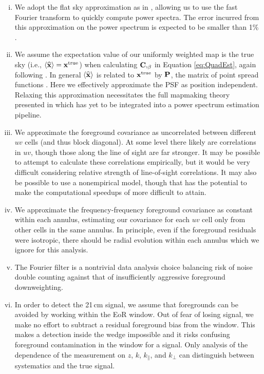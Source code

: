 \begin{enumerate}[i.]
\item We adopt the flat sky approximation as in \cite{DillonFast,X13}, allowing us to use the fast Fourier transform to quickly compute power spectra. The error incurred from this approximation on the power spectrum is expected to be smaller than 1\% \cite{X13}.

\item We assume the expectation value of our uniformly weighted map is the true sky (i.e., $\langle \widehat{\mathbf{x}} \rangle = \mathbf{x}^\text{true}$) when calculating $\mathbf{C},_\beta$ in Equation \ref{eq:QuadEst}, again following \cite{X13}. In general $\langle \widehat{\mathbf{x}} \rangle$ is related to $\mathbf{x}^\text{true}$ by $\mathbf{P}$, the matrix of point spread functions \cite{dillonmapmaking}. Here we effectively approximate the PSF as position independent. Relaxing this approximation necessitates the full mapmaking theory presented in \cite{dillonmapmaking} which has yet to be integrated into a power spectrum estimation pipeline. 

\item We approximate the foreground covariance as uncorrelated between different $uv$ cells (and thus block diagonal). At some level there likely are correlations in $uv$, though those along the line of sight are far stronger. It may be possible to attempt to calculate these correlations empirically, but it would be very difficult considering relative strength of line-of-sight correlations. It may also be possible to use a nonempirical model, though that has the potential to make the computational speedups of \cite{DillonFast} more difficult to attain.
 
\item We approximate the frequency-frequency foreground covariance as constant within each annulus, estimating our covariance for each $uv$ cell only from other cells in the same annulus. In principle, even if the foreground residuals were isotropic, there should be radial evolution within each annulus which we ignore for this analysis. 

\item The Fourier filter is a nontrivial data analysis choice balancing risk of noise double counting against that of insufficiently aggressive foreground downweighting.

\item In order to detect the 21\,cm signal, we assume that foregrounds can be avoided by working within the EoR window. Out of fear of losing signal, we make no effort to subtract a residual foreground bias from the window. This makes a detection inside the wedge impossible and it risks confusing foreground contamination in the window for a signal. Only analysis of the dependence of the measurement on $z$, $k$, $k_\|$, and $k_\perp$ can distinguish between systematics and the true signal. 

\end{enumerate}


